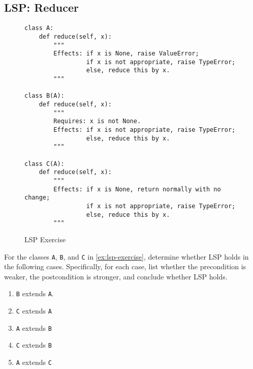 \documentclass[oneside,11pt,dvipsnames]{book}
\newcommand{\sol}[1]{\iftoggle{usesol}{\textbf{Sol:} #1}{}}
\newcommand{\code}[1]{\texttt{#1}}
\begin{document}
\subsection{LSP: Reducer}
\begin{figure}
\begin{lstlisting}
class A:
    def reduce(self, x):
        """
        Effects: if x is None, raise ValueError;
                 if x is not appropriate, raise TypeError;
                 else, reduce this by x.
        """

class B(A):
    def reduce(self, x):
        """
        Requires: x is not None.
        Effects: if x is not appropriate, raise TypeError;
                 else, reduce this by x.
        """

class C(A):
    def reduce(self, x):
        """
        Effects: if x is None, return normally with no change;
                 if x is not appropriate, raise TypeError;
                 else, reduce this by x.
        """
\end{lstlisting}
\caption{LSP Exercise}\label{ex:lsp-exercise}
\end{figure}

For the classes \code{A}, \code{B}, and \code{C} in \autoref{ex:lsp-exercise}, determine whether LSP holds in the following cases. Specifically, for each case, list whether the precondition is weaker, the postcondition is stronger, and conclude whether LSP holds.
\begin{enumerate}
    \item \code{B} extends \code{A}.
    \sol{B's pre is stronger than A's because it requires that $x$ is not None while A's has no pre. \textbf{LSP does not hold}. The posts of \code{A} and \code{B} are the same}
    \item \code{C} extends \code{A}
    \sol{Pre's are the same (both are total methods). C's post is stronger than A's because it allows $x$ to be None while A's does not. \textbf{LSP holds}.}
    \item \code{A} extends \code{B}
    \sol{A's pre is weaker than B's because A has no pre. The posts for both are essentially the same because B's pre explicitly requires $x$ to be not None. \textbf{LSP holds}. Note that you might argue A's post is stronger, which is also fine and also means LSP holds.}
    \item \code{C} extends \code{B}
    \sol{C's pre is weaker than B's because C allows $x$ to be None while B does not. The posts are the same. \textbf{LSP does not hold}.}
    \item \code{A} extends \code{C}
\end{enumerate}
\end{document}
